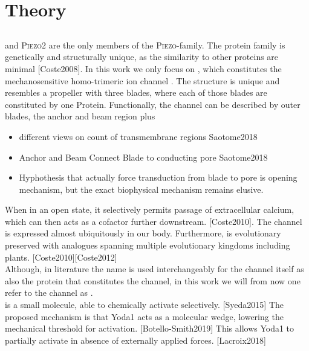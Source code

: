 \section{Theory}

\subsection{\Piezo{}}


\Piezo{} and \textsc{Piezo2} are the only members of the \textsc{Piezo}-family. The protein family is genetically and structurally unique, as the similarity to other proteins are minimal [Coste2008]. In this work we only focus on \Piezo{}, which constitutes the mechanosensitive homo-trimeric ion channel \Piezo{}. The structure is unique and resembles a propeller with three blades, where each of those blades are constituted by one \Piezo{} Protein. Functionally, the channel can be described by outer blades, the anchor and beam region plus

\begin{itemize}
	\item different views on count of transmembrane regions Saotome2018
	\item Anchor and Beam Connect Blade to conducting pore Saotome2018
	\item Hyphothesis that actually force transduction from blade to pore is opening mechanism, but the exact biophysical mechanism remains elusive. 
\end{itemize}

 When in an open state, it selectively permits passage of extracellular calcium, which can then acts as a cofactor further downstream. [Coste2010]. The channel is expressed almost ubiquitously in our body. Furthermore, \Piezo{} is evolutionary preserved with analogues spanning multiple evolutionary kingdoms including plants. [Coste2010][Coste2012]\\
Although, in literature the name \Piezo{} is used interchangeably for the channel itself as also the protein that constitutes the channel, in this work we will from now one refer to the channel as \Piezo{}.\\
\Yoda{} is a small molecule, able to chemically activate \Piezo{} selectively. [Syeda2015] The proposed mechanism is that Yoda1 acts as a molecular wedge, lowering the mechanical threshold for activation. [Botello-Smith2019] This allows Yoda1 to partially activate \Piezo{} in absence of externally applied forces. [Lacroix2018]

